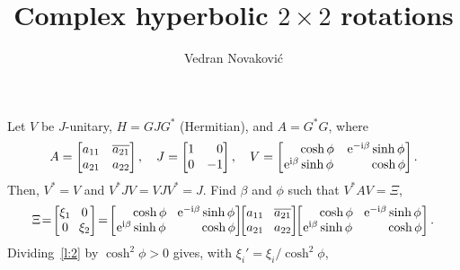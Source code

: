 \documentclass[a4paper,12pt,twoside]{article}
\title{Complex hyperbolic $2\times 2$ rotations}
\author{Vedran Novakovi\'{c}}
\begin{document}
\maketitle
Let $V$ be $J$-unitary, $H=GJG^{\ast}$ (Hermitian), and $A=G^{\ast}G$, where
\begin{equation}
  A=\begin{bmatrix}
  a_{11} & \overline{a_{21}}\\
  a_{21} & a_{22}
  \end{bmatrix},\quad
  J=\begin{bmatrix}
  1 & \hphantom{-}0\\
  0 & -1
  \end{bmatrix},\quad
  V=\begin{bmatrix}
  \hphantom{\mathrm{e}^{\mathrm{i}\beta}}\cosh\phi & \mathrm{e}^{-\mathrm{i}\beta}\sinh\phi\\
  \mathrm{e}^{\mathrm{i}\beta}\sinh\phi & \hphantom{\mathrm{e}^{-\mathrm{i}\beta}}\cosh\phi
  \end{bmatrix}.
  \label{e:1}
\end{equation}
Then, $V^{\ast}=V$ and $V^{\ast}JV=VJV^{\ast}=J$.  Find $\beta$ and
$\phi$ such that $V^{\ast}AV=\Xi$,
\begin{equation}
  \Xi\!=\!\begin{bmatrix}
  \xi_1 & \!\!0\\
  0 & \!\!\xi_2
  \end{bmatrix}\!=\!\begin{bmatrix}
  \hphantom{\mathrm{e}^{\mathrm{i}\beta}}\cosh\phi & \!\mathrm{e}^{-\mathrm{i}\beta}\sinh\phi\\
  \mathrm{e}^{\mathrm{i}\beta}\sinh\phi & \!\hphantom{\mathrm{e}^{-\mathrm{i}\beta}}\cosh\phi
  \end{bmatrix}\!\!\begin{bmatrix}
  a_{11} & \!\overline{a_{21}}\\
  a_{21} & \!a_{22}
  \end{bmatrix}\!\!\begin{bmatrix}
  \hphantom{\mathrm{e}^{\mathrm{i}\beta}}\cosh\phi & \!\mathrm{e}^{-\mathrm{i}\beta}\sinh\phi\\
  \mathrm{e}^{\mathrm{i}\beta}\sinh\phi & \!\hphantom{\mathrm{e}^{-\mathrm{i}\beta}}\cosh\phi
  \end{bmatrix}.
  \label{l:2}
\end{equation}
Dividing~\eqref{l:2} by $\cosh^2\phi>0$ gives, with
$\xi_i'=\xi_i^{}/\cosh^2\phi$,
\end{document}
